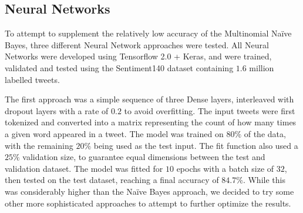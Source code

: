 \documentclass{article}
\begin{document}
  \subsection{Neural Networks}

  

  \indent To attempt to supplement the relatively low accuracy of the
  Multinomial Naïve Bayes, three different Neural Network approaches
  were tested. All Neural Networks were developed using Tensorflow 2.0
  + Keras, and were trained, validated and tested using the
  Sentiment140 dataset containing $1.6$ million labelled tweets. 

  \begin{wrapfigure}{r}{0.30\linewidth}
    \vspace{-20pt}
    \begin{center}
      \texttt{[image: \{Dense.png]}}
    \end{center}
    \captionsetup{justification=centering}
    \caption{Diagram of Densely Layered Neural Network} 
    \label{fig:dense}
    \vspace{-10pt}
  \end{wrapfigure}
  
  The first approach was a simple sequence of three Dense layers,
  interleaved with dropout layers with a rate of $0.2$ to avoid
  overfitting. The input tweets were first tokenized and converted
  into a matrix representing the count of how many times a given word
  appeared in a tweet. The model was trained on $80\%$ of the data,
  with the remaining $20\%$ being used as the test input. The fit
  function also used a $25\%$ validation size, to guarantee equal
  dimensions between the test and validation dataset. The model was
  fitted for $10$ epochs with a batch size of $32$, then tested on the
  test dataset, reaching a final accuracy of $84.7\%$. While this was
  considerably higher than the Naïve Bayes approach, we decided to try
  some other more sophisticated approaches to attempt to further
  optimize the results. 

\end{document}
